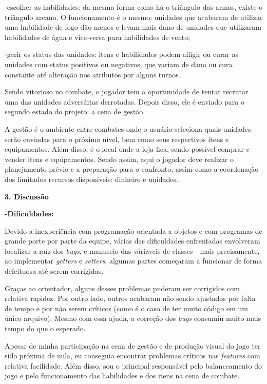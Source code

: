 \documentclass{article}
\begin{document}
\qquad -escolher as habilidades: da mesma forma como há o triângulo das armas, existe o triângulo arcano. O funcionamento é o mesmo: unidades que acabaram de utilizar uma habilidade de fogo dão menos e levam mais dano de unidades que utilizaram habilidades de água e vice-versa para habilidades de vento;

\qquad -gerir os status das unidades: itens e habilidades podem afligir ou curar as unidades com status positivos ou negativos, que variam de dano ou cura constante até alteração nos atributos por alguns turnos.

\bigskip
\qquad Sendo vitorioso no combate, o jogador tem a oportunidade de tentar recrutar uma das unidades adversárias derrotadas. Depois disso, ele é enviado para o segundo estado do projeto: a cena de gestão.

\qquad A gestão é o ambiente entre combates onde o usuário seleciona quais unidades serão enviadas para o próximo nível, bem como seus respectivos itens e equipamentos. Além disso, é o local onde a loja fica, sendo possível comprar e vender itens e equipamentos. Sendo assim, aqui o jogador deve realizar o planejamento prévio e a preparação para o confronto, assim como a coordenação dos limitados recursos disponíveis: dinheiro e unidades.

\bigskip
\bigskip
\textbf{\large{3. Discussão}}

\bigskip
\quad\textbf{-Dificuldades:}

\qquad Devido a inexperiência com programação orientada a objetos e com programas de grande porte por parte da equipe, várias das dificuldades enfrentadas envolveram localizar a raíz dos \textit{bugs}, e manuseio das váriaveis de classes - mais precisamente, ao implementar \textit{getters} e \textit{setters}, algumas partes começaram a funcionar de forma defeituosa até serem corrigidas.

\qquad Graças ao orientador, alguns desses problemas puderam ser corrigidos com relativa rapidez. Por outro lado, outros acabaram não sendo ajustados por falta de tempo e por não serem críticos (como é o caso de ter muito código em um único arquivo). Mesmo com essa ajuda, a correção dos  \textit{bugs} consumiu muito mais tempo do que o esperado.

\qquad Apesar de minha participação na cena de gestão e de produção visual do jogo ter sido próxima de nula, eu conseguia encontrar problemas críticos nas \textit{features} com relativa facilidade. Além disso, sou o principal responsável pelo balanceamento do jogo e pelo funcionamento das habilidades e dos itens na cena de combate.
\end{document}

